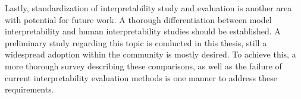 \noindent Lastly, standardization of interpretability study and evaluation is another area 
with potential for future work. A thorough differentiation between model 
interpretability and human interpretability studies should be established. A preliminary study 
regarding this topic is conducted in this thesis, still a widespread adoption within the 
community is mostly desired. To achieve this, a more thorough survey describing these comparisons, 
as well as the failure of current interpretability evaluation methods is one manner to address 
these requirements.\\